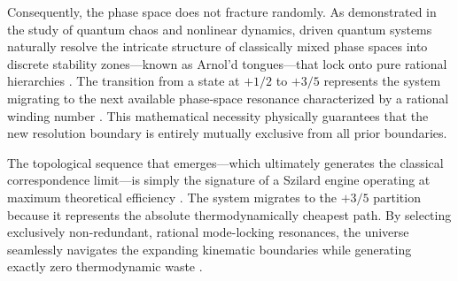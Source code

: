 \documentclass[%
  aps, reprint, prl, amsmath,amssymb
]{revtex4-2}
\begin{document}
Consequently, the phase space does not fracture randomly. As demonstrated in the study of quantum chaos and nonlinear dynamics, driven quantum systems naturally resolve the intricate structure of classically mixed phase spaces into discrete stability zones---known as Arnol'd tongues---that lock onto pure rational hierarchies \cite{Gutzwiller1990, Haake2010}. The transition from a state at $+1/2$ to $+3/5$ represents the system migrating to the next available phase-space resonance characterized by a rational winding number \cite{Gutzwiller1990}. This mathematical necessity physically guarantees that the new resolution boundary is entirely mutually exclusive from all prior boundaries.

The topological sequence that emerges---which ultimately generates the classical correspondence limit---is simply the signature of a Szilard engine operating at maximum theoretical efficiency \cite{PlenioVitelli2001}. The system migrates to the $+3/5$ partition because it represents the absolute thermodynamically cheapest path. By selecting exclusively non-redundant, rational mode-locking resonances, the universe seamlessly navigates the expanding kinematic boundaries while generating exactly zero thermodynamic waste \cite{Landauer1961, Gutzwiller1990}.


\end{document}
